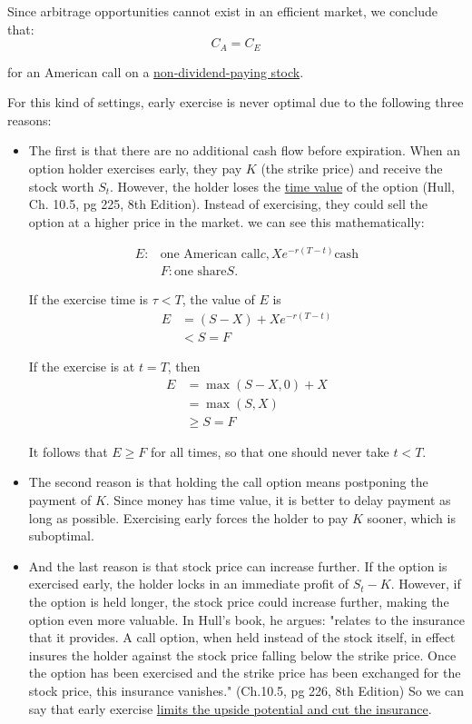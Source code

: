 \documentclass[letterpaper]{article}
\begin{document}
		Since arbitrage opportunities cannot exist in an efficient market, we conclude that:
		$$
			C_A = C_E
		$$
		
		for an American call on a \underline{non-dividend-paying stock}.
		
		For this kind of settings, early exercise is never optimal due to the following three reasons:
		
		\begin{itemize}
		
		\item The first is that there are no additional cash flow before expiration. When an option holder exercises early, they pay $K$ (the strike price) and receive the stock worth $S_t$. However, the holder loses the \underline{time value} of the option (Hull, Ch. 10.5, pg 225, 8th Edition). Instead of exercising, they could sell the option at a higher price in the market. we can see this mathematically:
		
		$$
		\begin{aligned}
		E: &\text{one American call}c, X e^{-r(T-t)}\text{cash}\\
		&F: \text{one share} S.
	\end{aligned}
$$

		If the exercise time is $\tau<T$, the value of $E$ is
		$$
		\begin{aligned}
			E & =(S-X)+X e^{-r(T-t)} \\
			& <S=F
		\end{aligned}
		$$
		
		If the exercise is at $t=T$, then
		$$
		\begin{aligned}
			E & =\max (S-X, 0)+X \\
			& =\max (S, X) \\
			& \geq S=F
		\end{aligned}
		$$
		
		It follows that $E \geq F$ for all times, so that one should never take $t<T$.
		
		\item The second reason is that holding the call option means postponing the payment of $K$. Since money has time value, it is better to delay payment as long as possible. Exercising early forces the holder to pay $K$ sooner, which is suboptimal.
		
		\item And the last reason is that stock price can increase further. If the option is exercised early, the holder locks in an immediate profit of $S_t - K$. However, if the option is held longer, the stock price could increase further, making the option even more valuable. In Hull's book, he argues: "relates to the insurance that it provides. A call option, when held instead of the stock itself, in effect insures the holder against the stock price falling below the strike price. Once the option has been exercised and the strike price has been exchanged for the stock price, this insurance vanishes." (Ch.10.5, pg 226, 8th Edition) So we can say that early exercise \underline{limits the upside potential and cut the insurance}.
		
	\end{itemize}
\end{document}
